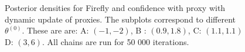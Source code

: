 \begin{figure}[ht]
    \caption{Posterior densities for Firefly and confidence with proxy with dynamic update of proxies. The subplots correspond to different $\theta^{\left(0\right)}$. These are are:   A: $(-1, -2)$, B : $(0.9, 1.8)$, C: $(1.1, 1.1)$ D: $(3, 6)$. All chains are run for 50 000 iterations.}%
    \label{fig:density_50k_02_06}%
\end{figure}


